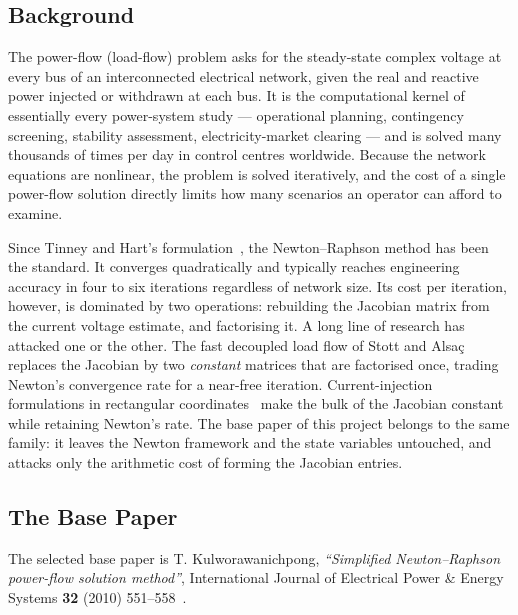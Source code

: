 \documentclass[sigconf,nonacm]{acmart}
\begin{document}
\subsection{Background}
The power-flow (load-flow) problem asks for the steady-state complex voltage at
every bus of an interconnected electrical network, given the real and reactive
power injected or withdrawn at each bus. It is the computational kernel of
essentially every power-system study --- operational planning, contingency
screening, stability assessment, electricity-market clearing --- and is solved
many thousands of times per day in control centres worldwide. Because the
network equations are nonlinear, the problem is solved iteratively, and the cost
of a single power-flow solution directly limits how many scenarios an operator
can afford to examine.

Since Tinney and Hart's formulation~\cite{tinney1967}, the Newton--Raphson
method has been the standard. It converges quadratically and typically reaches
engineering accuracy in four to six iterations regardless of network size. Its
cost per iteration, however, is dominated by two operations: rebuilding the
Jacobian matrix from the current voltage estimate, and factorising it. A long
line of research has attacked one or the other. The fast decoupled load flow of
Stott and Alsa\c{c}~\cite{stott1974} replaces the Jacobian by two \emph{constant}
matrices that are factorised once, trading Newton's convergence rate for a
near-free iteration. Current-injection formulations in rectangular
coordinates~\cite{dacosta1999} make the bulk of the Jacobian constant while
retaining Newton's rate. The base paper of this project belongs to the same
family: it leaves the Newton framework and the state variables untouched, and
attacks only the arithmetic cost of forming the Jacobian entries.

\subsection{The Base Paper}
The selected base paper is T. Kulworawanichpong, \emph{``Simplified
Newton--Raphson power-flow solution method''}, International Journal of
Electrical Power \& Energy Systems \textbf{32} (2010)
551--558~\cite{kulworawanichpong2010}.
\end{document}
